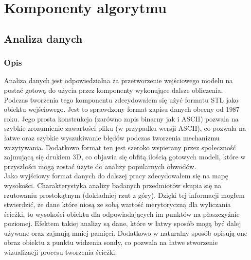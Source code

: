 \documentclass[a4paper,12pt,twoside,openany]{report}
\begin{document}
\chapter{Komponenty algorytmu}

  \section{Analiza danych}
    \subsection{Opis}
      Analiza danych jest odpowiedzialna za przetworzenie wejściowego 
      modelu na postać gotową do użycia przez komponenty wykonujące dalsze obliczenia.
      Podczas tworzenia tego komponentu zdecydowałem się użyć formatu STL jako obiektu wejściowego.
      Jest to sprawdzony format zapisu danych obecny od 1987 roku. 
      Jego prosta konstrukcja (zarówno zapis binarny jak i ASCII)
      pozwala na szybkie zrozumienie zawartości pliku (w przypadku wersji ASCII), 
      co pozwala na łatwe oraz szybkie wyszukiwanie błędów
      podczas tworzenia mechanizmu wczytywania. Dodatkowo format ten jest 
      szeroko wspierany przez społeczność zajmującą się drukiem 3D,
      co objawia się obfitą ilością gotowych modeli, które w przyszłości mogą 
      zostać użyte do analizy popularnych obwodów.\\
      Jako wyjściowy format danych do dalszej pracy zdecydowałem się na mapę wysokości.
      Charakterystyka analizy badanych przedmiotów skupia się na rzutowaniu prostokątnym
      (dokładniej rzut z góry). Dzięki tej informacji mogłem stwierdzić, 
      że dane które niosą ze sobą wartość merytoryczną dla wyliczania ścieżki,
      to wysokości obiektu dla odpowiadających im punktów na płaszczyźnie poziomej.
      Efektem takiej analizy są dane, które w łatwy sposób mogą być dalej używane oraz 
      zajmują mniej pamięci. Dodatkowo w naturalny sposób opisują one obraz obiektu 
      z punktu widzenia sondy, co pozwala na łatwe stworzenie wizualizacji procesu tworzenia ścieżki.
    
\end{document}
